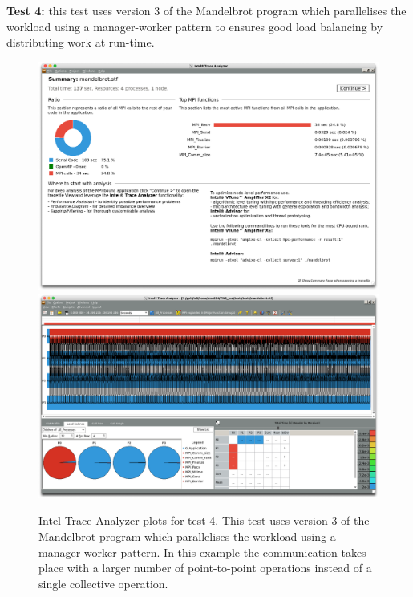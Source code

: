 \documentclass[a4paper,titlepage]{article}
\begin{document}
\noindent
\textbf{Test 4:} this test uses version 3 of the Mandelbrot program which parallelises the workload using a manager-worker pattern to ensures good load balancing by distributing work at run-time.
\begin{figure}[htbp]
\begin{center}
\includegraphics[scale=0.3]{figures/test4_summary}
\includegraphics[scale=0.3]{figures/test4_eventTimeline}
\caption{Intel Trace Analyzer plots for test 4. This test uses version 3 of the Mandelbrot program which parallelises the workload using a manager-worker pattern. In this example the communication takes place with a larger number of point-to-point operations instead of a single collective operation.}
\label{fig:test4_ITAC_summary}
\end{center}
\end{figure}
\end{document}
